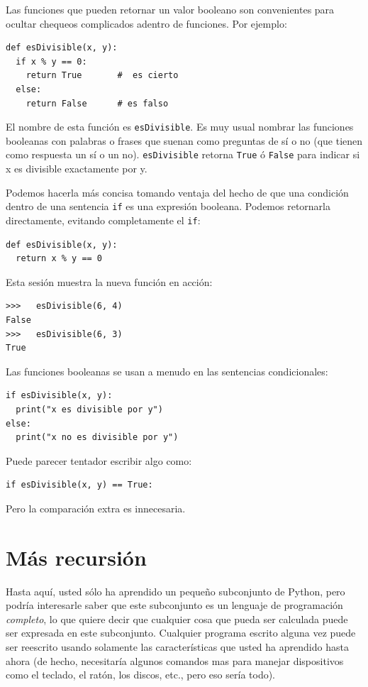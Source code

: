 \label{boolean}  

Las funciones que pueden retornar un valor booleano son convenientes
para ocultar chequeos complicados adentro de funciones. Por ejemplo:

\begin{verbatim}
def esDivisible(x, y):
  if x % y == 0:
    return True       #  es cierto
  else:
    return False      # es falso
\end{verbatim}
 El nombre de esta función es \texttt{esDivisible}. Es muy usual nombrar
las funciones booleanas con palabras o frases que suenan como preguntas
de sí o no (que tienen como respuesta un sí o un no). \texttt{esDivisible}
retorna \texttt{True} ó \texttt{False} para indicar si x es divisible
exactamente por y.

Podemos hacerla más concisa tomando ventaja del hecho de que una condición
dentro de una sentencia \texttt{if} es una expresión booleana. Podemos
retornarla directamente, evitando completamente el \texttt{if}:

\begin{verbatim}
def esDivisible(x, y):
  return x % y == 0
\end{verbatim}
 Esta sesión muestra la nueva función en acción:

\begin{verbatim}
>>>   esDivisible(6, 4)
False
>>>   esDivisible(6, 3)
True
\end{verbatim}

Las funciones booleanas se usan a menudo en las sentencias condicionales:

\begin{verbatim}
if esDivisible(x, y):
  print("x es divisible por y")
else:
  print("x no es divisible por y")
\end{verbatim}
 Puede parecer tentador escribir algo como:

\begin{verbatim}
if esDivisible(x, y) == True:
\end{verbatim}
 Pero la comparación extra es innecesaria.

\section{Más recursión}

  
 

Hasta aquí, usted sólo ha aprendido un pequeño subconjunto de Python,
pero podría interesarle saber que este subconjunto es un lenguaje
de programación {\em completo}, lo que quiere decir que cualquier
cosa que pueda ser calculada puede ser expresada en este subconjunto.
Cualquier programa escrito alguna vez puede ser reescrito usando solamente
las características que usted ha aprendido hasta ahora (de hecho,
necesitaría algunos comandos mas para manejar dispositivos como el
teclado, el ratón, los discos, etc., pero eso sería todo).

